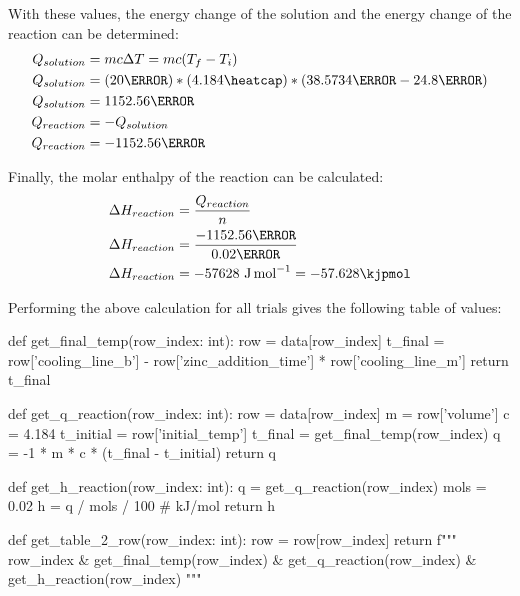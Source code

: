 \documentclass[demo, 12pt, notitlepage, letterpaper]{report}
\begin{document}
With these values, the energy change of the solution and the energy change of the reaction can be determined:
\begin{align*}
	Q_{solution} & = mc\Delta T = mc(T_f - T_i)
	\\
	Q_{solution} & = (20\gram) * (4.184\heatcap) * (38.5734\celsius - 24.8\celsius)
	\\
	Q_{solution} & = 1152.56\joule
	\\
	Q_{reaction} & = -Q_{solution}
	\\
	Q_{reaction} & = -1152.56\joule
\end{align*}

Finally, the molar enthalpy of the reaction can be calculated:
\begin{align*}
	\Delta H_{reaction} & = \frac{Q_{reaction}}{n}                        \\
	\Delta H_{reaction} & = \frac{-1152.56\joule}{0.02\mol}               \\
	\Delta H_{reaction} & = -57628~\unit{\joule\per\mol} = -57.628\kjpmol
\end{align*}

Performing the above calculation for all trials gives the following table of values:

\begin{pycode}
def get_final_temp(row_index: int):
	row = data[row_index]
	t_final = row['cooling_line_b'] - row['zinc_addition_time'] * row['cooling_line_m']
	return t_final

def get_q_reaction(row_index: int):
	row = data[row_index]
	m = row['volume']
	c = 4.184
	t_initial = row['initial_temp']
	t_final = get_final_temp(row_index)
	q = -1 * m * c * (t_final - t_initial)
	return q

def get_h_reaction(row_index: int):
	q = get_q_reaction(row_index)
	mols = 0.02
	h = q / mols / 100 # kJ/mol
	return h

def get_table_2_row(row_index: int):
	row = row[row_index]
	return f"""
		{row_index}
		& {get_final_temp(row_index)}
		& {get_q_reaction(row_index)}
		& {get_h_reaction(row_index)}
	"""
\end{pycode}
\end{document}
